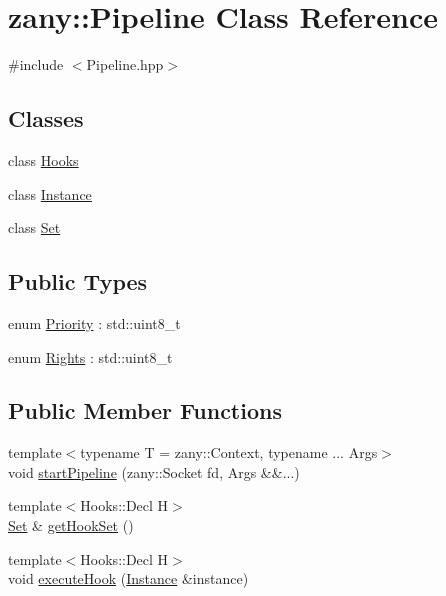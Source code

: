 \hypertarget{classzany_1_1_pipeline}{}\section{zany\+:\+:Pipeline Class Reference}
\label{classzany_1_1_pipeline}


{\ttfamily \#include $<$Pipeline.\+hpp$>$}

\subsection*{Classes}
\begin{DoxyCompactItemize}
\item 
class \hyperlink{classzany_1_1_pipeline_1_1_hooks}{Hooks}
\item 
class \hyperlink{classzany_1_1_pipeline_1_1_instance}{Instance}
\item 
class \hyperlink{classzany_1_1_pipeline_1_1_set}{Set}
\end{DoxyCompactItemize}
\subsection*{Public Types}
\begin{DoxyCompactItemize}
\item 
enum \hyperlink{classzany_1_1_pipeline_ab49de07eef2daaaa382e3a7b75c9e662}{Priority} \+: std\+::uint8\+\_\+t 
\item 
enum \hyperlink{classzany_1_1_pipeline_a1d41e45c2e3e9716efd9e7ae6eae99be}{Rights} \+: std\+::uint8\+\_\+t 
\end{DoxyCompactItemize}
\subsection*{Public Member Functions}
\begin{DoxyCompactItemize}
\item 
{\footnotesize template$<$typename T  = zany\+::\+Context, typename ... Args$>$ }\\void \hyperlink{classzany_1_1_pipeline_a6d37ae7b4a0045d1a9a5a8dacbd8ac29}{start\+Pipeline} (zany\+::\+Socket fd, Args \&\&...)
\item 
{\footnotesize template$<$Hooks\+::\+Decl H$>$ }\\\hyperlink{classzany_1_1_pipeline_1_1_set}{Set} \& \hyperlink{classzany_1_1_pipeline_afe387915735556acc7fc8382d9504bb7}{get\+Hook\+Set} ()
\item 
{\footnotesize template$<$Hooks\+::\+Decl H$>$ }\\void \hyperlink{classzany_1_1_pipeline_a80d8242dd8e8b94f92cc215f76427c49}{execute\+Hook} (\hyperlink{classzany_1_1_pipeline_1_1_instance}{Instance} \&instance)
\end{DoxyCompactItemize}


